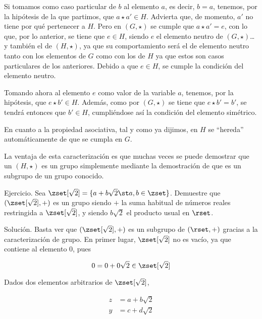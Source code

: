 Si tomamos como caso particular de $b$ al elemento $a$, es decir, $b = a$,
tenemos, por la hipótesis de la que partimos, que $a \star a' \in H$.
Advierta que, de momento, $a'$ no tiene por qué pertenecer a $H$. Pero en
$(G, \star)$ se cumple que $a \star a' = e$, con lo que, por lo anterior, se
tiene que $e \in H$, siendo $e$ el elemento neutro de $(G, \star)$\ldots{} y
también el de $(H, \star)$, ya que su comportamiento será el de elemento
neutro tanto con los elementos de $G$ como con los de $H$ ya que estos son
casos particulares de los anteriores. Debido a que $e \in H$, se cumple la
condición del elemento neutro.

Tomando ahora al elemento $e$ como valor de la variable $a$, tenemos, por la
hipótesis, que $e \star b' \in H$. Además, como por $(G, \star)$ se tiene
que $e \star b' = b'$, se tendrá entonces que $b' \in H$, cumpliéndose así
la condición del elemento simétrico.

En cuanto a la propiedad asociativa, tal y como ya dijimos, en $H$ se
``hereda'' automáticamente de que se cumpla en $G$.

\iffalse
En consecuencia, $e = a \star a' \in H$. Luego el elemento neutro es un
elemento de $H$ y se cumple ii). En consecuencia, para todo $b \in H$ se
tiene que $e \star b' = b' \in H$ y se cumple iii). Finalmente, la operación
$\star$ es interna en $H$ pues si $a, b \in H$, acabamos de ver que $b' \in
H$ y por tanto $a \star (b')' = a \star b \in H$.
\fi

La ventaja de esta caracterización es que muchas veces se puede demostrar
que un $(H, \star)$ es un grupo simplemente mediante la demostración de que
es un subgrupo de un grupo conocido.

Ejercicio. Sea $\zset[\sqrt{2}] = \{a + b\sqrt{2} \st a, b \in \zset\}$.
Demuestre que $(\zset[\sqrt{2}], +)$ es un grupo siendo $+$ la suma habitual
de números reales restringida a $\zset[\sqrt{2}]$, y siendo $b\sqrt{2}$ el
producto usual en $\rset$.

Solución. Basta ver que $(\zset[\sqrt{2}], +)$ es un subgrupo de $(\rset,
+)$ gracias a la caracterización de grupo. En primer lugar,
$\zset[\sqrt{2}]$ no es vacío, ya que contiene al elemento 0, pues

$$ 0 = 0 + 0\sqrt{2} \in \zset[\sqrt{2}] $$

Dados dos elementos arbitrarios de $\zset[\sqrt{2}]$,

\begin{align*}
  z &= a + b\sqrt{2} \\
  y &= c + d\sqrt{2} \\
\end{align*}

